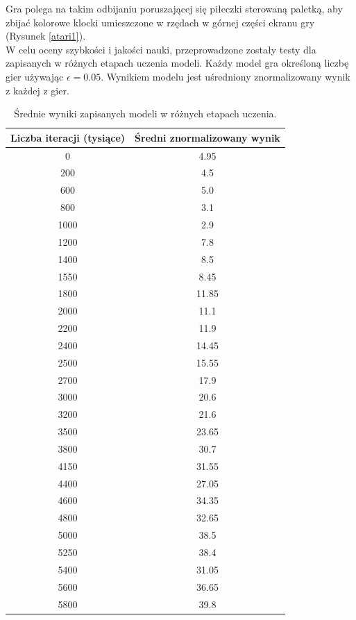 \documentclass[12pt]{article}
\begin{document}
Gra polega na takim odbijaniu poruszającej się piłeczki sterowaną paletką, aby zbijać kolorowe klocki umieszczone w rzędach w górnej części ekranu gry (Rysunek \ref{atari1}).
\\
W celu oceny szybkości i jakości nauki, przeprowadzone zostały testy dla zapisanych w różnych etapach uczenia modeli. Każdy model gra określoną liczbę gier używając $\epsilon=0.05$. Wynikiem modelu jest uśredniony znormalizowany wynik z każdej z gier. 

\begin{center}
\begin{table}[H]
  \centering%
  \caption{Średnie wyniki zapisanych modeli w różnych etapach uczenia.}
\begin{tabular}{|c|c|}
\hline
\textbf{Liczba iteracji (tysiące)} & \textbf{Średni znormalizowany wynik}\\
\hline
0 &  4.95 \\
\hline
200  &  4.5 \\
\hline
600  &  5.0 \\
\hline
800  &  3.1 \\
\hline
1000  &  2.9 \\
\hline
1200  &  7.8 \\
\hline
1400  &  8.5 \\
\hline
1550  &  8.45 \\
\hline
1800  &  11.85 \\
\hline
2000  &  11.1 \\
\hline
2200  &  11.9 \\
\hline
2400  &  14.45 \\
\hline
2500  &  15.55 \\
\hline
2700  &  17.9 \\
\hline
3000  &  20.6 \\
\hline
3200  &  21.6 \\
\hline
3500  &  23.65 \\
\hline
3800  &  30.7 \\
\hline
4150  &  31.55 \\
\hline
4400  &  27.05 \\
\hline
4600  &  34.35 \\
\hline
4800  &  32.65 \\
\hline
5000  &  38.5 \\
\hline
5250  &  38.4 \\
\hline
5400  &  31.05 \\
\hline
5600  &  36.65 \\
\hline
5800  &  39.8 \\

\end{tabular}
\end{table}
\end{center}
\end{document}

